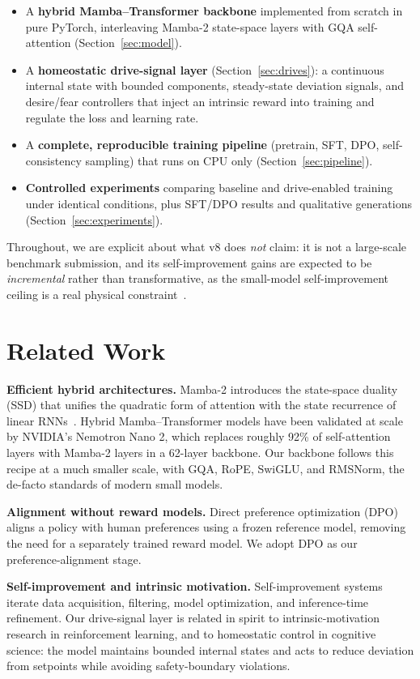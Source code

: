 \documentclass[11pt]{article}
\begin{document}
\begin{itemize}
\item A \textbf{hybrid Mamba--Transformer backbone} implemented from scratch in
pure PyTorch, interleaving Mamba-2 state-space layers with GQA self-attention
(Section~\ref{sec:model}).
\item A \textbf{homeostatic drive-signal layer} (Section~\ref{sec:drives}): a
continuous internal state with bounded components, steady-state deviation
signals, and desire/fear controllers that inject an intrinsic reward into
training and regulate the loss and learning rate.
\item A \textbf{complete, reproducible training pipeline} (pretrain,
SFT, DPO, self-consistency sampling) that runs on CPU only
(Section~\ref{sec:pipeline}).
\item \textbf{Controlled experiments} comparing baseline and drive-enabled
training under identical conditions, plus SFT/DPO results and qualitative
generations (Section~\ref{sec:experiments}).
\end{itemize}

Throughout, we are explicit about what v8 does \emph{not} claim: it is not a
large-scale benchmark submission, and its self-improvement gains are expected to
be \emph{incremental} rather than transformative, as the small-model
self-improvement ceiling is a real physical constraint~\cite{selfimp}.

\section{Related Work}
\label{sec:related}

\textbf{Efficient hybrid architectures.} Mamba-2 introduces the state-space
duality (SSD) that unifies the quadratic form of attention with the state
recurrence of linear RNNs~\cite{mamba2}. Hybrid Mamba--Transformer models have
been validated at scale by NVIDIA's Nemotron Nano 2, which replaces roughly 92\%
of self-attention layers with Mamba-2 layers in a 62-layer backbone. Our
backbone follows this recipe at a much smaller scale, with GQA, RoPE, SwiGLU,
and RMSNorm, the de-facto standards of modern small models.

\textbf{Alignment without reward models.} Direct preference optimization
(DPO)~\cite{dpo} aligns a policy with human preferences using a frozen reference
model, removing the need for a separately trained reward model. We adopt DPO as
our preference-alignment stage.

\textbf{Self-improvement and intrinsic motivation.} Self-improvement
systems~\cite{selfplay,selfimp} iterate data acquisition, filtering, model
optimization, and inference-time refinement. Our drive-signal layer is related
in spirit to intrinsic-motivation research in reinforcement learning, and to
homeostatic control in cognitive science: the model maintains bounded internal
states and acts to reduce deviation from setpoints while avoiding safety-boundary
violations.
\end{document}
